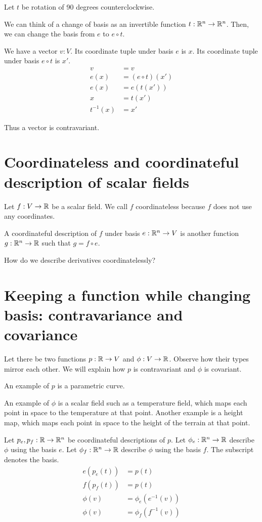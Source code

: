 Let \(t\) be rotation of 90 degrees counterclockwise.

We can think of a change of basis as an invertible function \( t : \mathbb{R}^n \to \mathbb{R}^n \).
Then, we can change the basis from \(e\) to \(e \circ t\).

We have a vector \(v : V\).
Its coordinate tuple under basis \(e\) is \(x\).
Its coordinate tuple under basis \(e \circ t\) is \(x'\).
\begin{align*}
    v &= v
    \\ e(x) &= (e \circ t)(x')
    \\ e(x) &= e(t(x'))
    \\ x &= t(x')
    \\ t^{-1}(x) &= x'
\end{align*}

Thus a vector is contravariant.

\section{Coordinateless and coordinateful description of scalar fields}

Let \(f : V \to \mathbb{R}\) be a scalar field.
We call \(f\) coordinateless because \(f\) does not use any coordinates.

A coordinateful description of \(f\) under basis \(e : \mathbb{R}^n \to V\) is
another function \(g : \mathbb{R}^n \to \mathbb{R}\)
such that \(g = f \circ e\).

How do we describe derivatives coordinatelessly?

\section{Keeping a function while changing basis: contravariance and covariance}

Let there be two functions \( p : \mathbb{R} \to V \) and \( \phi : V \to \mathbb{R} \).
Observe how their types mirror each other.
We will explain how \( p \) is contravariant and \( \phi \) is covariant.

An example of \(p\) is a parametric curve.

An example of \( \phi \) is a scalar field such as a temperature field,
which maps each point in space to the temperature at that point.
Another example is a height map,
which maps each point in space to the height of the terrain at that point.

Let \( p_e, p_f : \mathbb{R} \to \mathbb{R}^n \) be coordinateful descriptions of \( p \).
Let \(\phi_e : \mathbb{R}^n \to \mathbb{R} \) describe \(\phi\) using the basis \(e\).
Let \(\phi_f : \mathbb{R}^n \to \mathbb{R} \) describe \(\phi\) using the basis \(f\).
The subscript denotes the basis.
\begin{align*}
    e(p_e(t)) &= p(t)
    \\ f(p_f(t)) &= p(t)
    \\ \phi(v) &= \phi_e(e^{-1}(v))
    \\ \phi(v) &= \phi_f(f^{-1}(v))
\end{align*}

